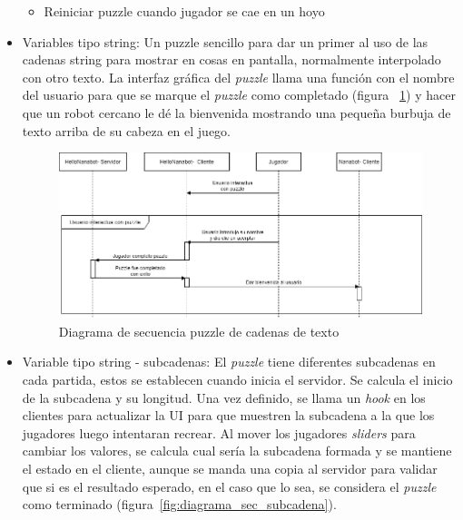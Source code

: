 \begin{itemize}
\begin{itemize}
        \item Reiniciar puzzle cuando jugador se cae en un hoyo
    \end{itemize}
    \item Variables tipo string: Un puzzle sencillo para dar un primer al uso de las cadenas string para mostrar en cosas en pantalla, normalmente interpolado con otro texto. La interfaz gráfica del \textit{puzzle} llama una función con el nombre del usuario para que se marque el \textit{puzzle} como completado (figura ~\ref{fig:diagrama_sec_string}) y hacer que un robot cercano le dé la bienvenida mostrando una pequeña burbuja de texto arriba de su cabeza en el juego.
    \begin{figure}[H]
        \centering
        \includegraphics[width=0.8\linewidth]{images/DiagramaSecuenciaPuzzleString.png}
        \caption{Diagrama de secuencia puzzle de cadenas de texto}
        \label{fig:diagrama_sec_string}
    \end{figure}
    \item Variable tipo string - subcadenas: El \textit{puzzle} tiene diferentes subcadenas en cada partida, estos se establecen cuando inicia el servidor. Se calcula el inicio de la subcadena y su longitud. Una vez definido, se llama un \textit{hook} en los clientes para actualizar la UI para que muestren la subcadena a la que los jugadores luego intentaran recrear. Al mover los jugadores \textit{sliders} para cambiar los valores, se calcula cual sería la subcadena formada y se mantiene el estado en el cliente, aunque se manda una copia al servidor para validar que si es el resultado esperado, en el caso que lo sea, se considera el \textit{puzzle} como terminado (figura~\ref{fig:diagrama_sec_subcadena}).
    \begin{figure}[H]
        \centering

\end{figure}
\end{itemize}
